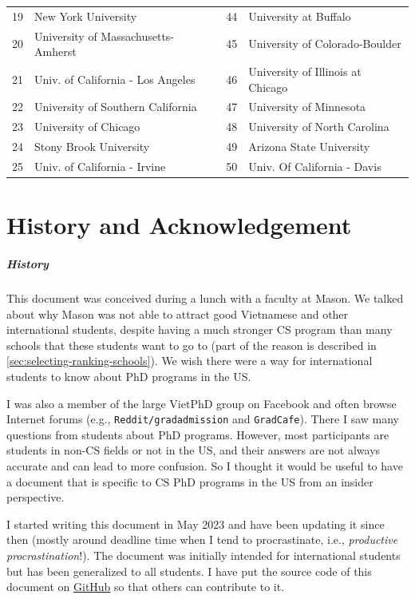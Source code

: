 \documentclass[oneside,11pt,dvipsnames]{book}
\newcommand{\red}[1]{{\color{red}{#1}}}
\begin{document}
\begin{table}[h]
\begin{tabular}{rl|rl}
    19 & New York University  & 44&  University at Buffalo\red{$^*$}\\
    20 &  University of Massachusetts-Amherst\red{$^*$} &45& University of Colorado-Boulder \\
    21 & Univ. of California - Los Angeles &46& University of Illinois at Chicago  \\
    22 & University of Southern California &47& University of Minnesota \\
    23 & University of Chicago &48& University of North Carolina\red{$^*$} \\
    24 & Stony Brook University\red{$^*$} &49& Arizona State University\red{$^*$} \\
    25 &  Univ. of California - Irvine&50& Univ. Of California - Davis \\
    \bottomrule
  \end{tabular}
\end{table}



\chapter*{History and Acknowledgement}\label{sec:ack}

\paragraph{History} This document was conceived during a lunch with a faculty at Mason.  We talked about why Mason was not able to attract good Vietnamese and other international students, despite having a much stronger CS program than many schools that these students want to go to (part of the reason is described in \autoref{sec:selecting-ranking-schools}). We wish there were a way for international students to know about PhD programs in the US.

I was also a member of the large VietPhD group on Facebook and often browse Internet forums (e.g., \texttt{Reddit/gradadmission} and \texttt{GradCafe}). There I saw many questions from students about PhD programs.  However, most participants are students in non-CS fields or not in the US, and their answers are not always accurate and can lead to more confusion. So I thought it would be useful to have a document that is specific to CS PhD programs in the US from an insider perspective.

I started writing this document in May 2023 and have been updating it since then (mostly around deadline time when I tend to procrastinate, i.e., \emph{productive procrastination}!). The document was initially intended for international students but has been generalized to all students.
I have put the source code of this document on \href{https://github.com/nguyenthanhvuh/phd-cs-us}{GitHub} so that others can contribute to it.
\end{document}
